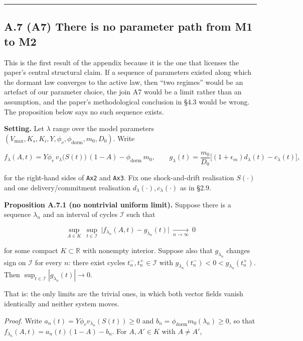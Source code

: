 \documentclass[11pt,a4paper]{article}
\newcounter{none}
\begin{document}
\begin{center}\rule{0.5\linewidth}{0.5pt}\end{center}

\subsection{A.7 (A7) There is no parameter path from M1 to M2}\label{a.7-a7-there-is-no-parameter-path-from-m1-to-m2}

This is the first result of the appendix because it is the one that licenses the
paper's central structural claim. If a sequence of parameters existed along which
the dormant law converges to the active law, then ``two regimes'' would be an
artefact of our parameter choice, the join A7 would be a limit rather than an
assumption, and the paper's methodological conclusion in §4.3 would be wrong.
The proposition below says no such sequence exists.

\textbf{Setting.} Let \(\lambda\) range over the model parameters
\((V_{\max},K_s,K_i,Y,\phi_v,\phi_{\mathrm{dorm}},m_0,D_0)\). Write

\[
f_\lambda(A,t)=Y\phi_v\,v_\lambda\big(S(t)\big)\,(1-A)-\phi_{\mathrm{dorm}}\,m_0,
\qquad
g_\lambda(t)=\frac{m_0}{D_0}\big[(1+\epsilon_m)d_\lambda(t)-c_\lambda(t)\big],
\]

for the right-hand sides of \texttt{Ax2} and \texttt{Ax3}. Fix one shock-and-drift realisation
\(S(\cdot)\) and one delivery/commitment realisation \(d_\lambda(\cdot),
c_\lambda(\cdot)\) as in §2.9.

\textbf{Proposition A.7.1 (no nontrivial uniform limit).} Suppose there is a sequence
\(\lambda_n\) and an interval of cycles \(\mathcal{I}\) such that

\[
\sup_{A\in K}\ \sup_{t\in\mathcal{I}}\ \big|f_{\lambda_n}(A,t)-g_{\lambda_n}(t)\big|\ \xrightarrow[n\to\infty]{}\ 0
\]

for some compact \(K\subset\mathbb{R}\) with nonempty interior. Suppose also that
\(g_{\lambda_n}\) changes sign on \(\mathcal{I}\) for every \(n\): there exist cycles
\(t_n^-,t_n^+\in\mathcal{I}\) with \(g_{\lambda_n}(t_n^-)<0<g_{\lambda_n}(t_n^+)\).
Then \(\sup_{t\in\mathcal{I}}|g_{\lambda_n}(t)|\to0\).

That is: the only limits are the trivial ones, in which both vector fields vanish
identically and neither system moves.

\emph{Proof.} Write \(a_n(t)=Y\phi_v v_{\lambda_n}(S(t))\ge0\) and
\(b_n=\phi_{\mathrm{dorm}}m_0(\lambda_n)\ge0\), so that
\(f_{\lambda_n}(A,t)=a_n(t)(1-A)-b_n\). For \(A,A'\in K\) with \(A\ne A'\),
\end{document}
